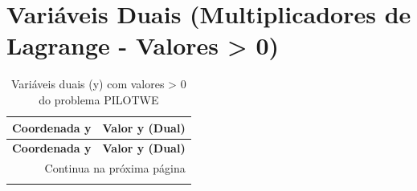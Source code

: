 \documentclass[12pt]{article}
\begin{document}
\section{Variáveis Duais (Multiplicadores de Lagrange - Valores > 0)}

\begin{longtable}{@{}cc@{}}
\caption{Variáveis duais (y) com valores > 0 do problema PILOTWE} \\
\toprule
\textbf{Coordenada y} & \textbf{Valor y (Dual)} \\
\midrule
\endfirsthead

\toprule
\textbf{Coordenada y} & \textbf{Valor y (Dual)} \\
\midrule
\endhead

\midrule \multicolumn{2}{r}{{Continua na próxima página}} \\ \midrule
\endfoot


\end{longtable}
\end{document}
